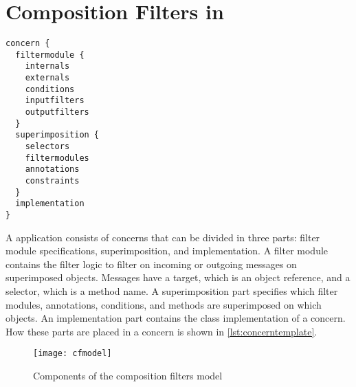 \section{Composition Filters in \Compose*{}}
\label{sec:CompositionFiltersInComposeStar}
\begin{lstlisting}[language=Composestar,style=floatlisting,float=hbp, caption={Abstract concern template},label={lst:concerntemplate}]
concern {
  filtermodule {
    internals
    externals
    conditions
    inputfilters
    outputfilters
  }
  superimposition {
    selectors
    filtermodules
    annotations
    constraints
  }
  implementation
}
\end{lstlisting}
A \Compose* application consists of concerns that can be divided in three parts: filter module specifications, superimposition, and implementation.
A filter module contains the filter logic to filter on incoming or outgoing messages on superimposed objects.
Messages have a target, which is an object reference, and a selector, which is a method name.
A superimposition part specifies which filter modules, annotations, conditions, and methods are superimposed on which objects.
An implementation part contains the class implementation of a concern.
How these parts are placed in a concern is shown in \autoref{lst:concerntemplate}.

\begin{figure}[hbp]
  \centering
  \texttt{[image: cfmodel]}
  \caption{Components of the composition filters model}
  \label{fig:cfmodel}
\end{figure}

